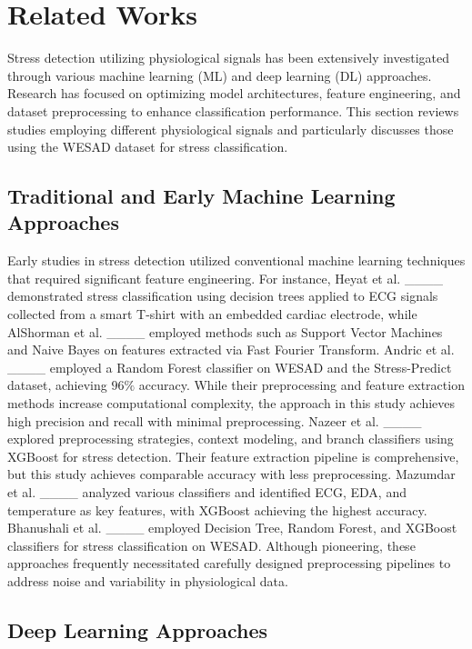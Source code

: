 \section{Related Works}
Stress detection utilizing physiological signals has been extensively investigated through various machine learning (ML) and deep learning (DL) approaches. Research has focused on optimizing model architectures, feature engineering, and dataset preprocessing to enhance classification performance. This section reviews studies employing different physiological signals and particularly discusses those using the WESAD dataset for stress classification.

\subsection{Traditional and Early Machine Learning Approaches}
Early studies in stress detection utilized conventional machine learning techniques that required significant feature engineering. For instance, Heyat et al. ____ demonstrated stress classification using decision trees applied to ECG signals collected from a smart T-shirt with an embedded cardiac electrode, while AlShorman et al. ____ employed methods such as Support Vector Machines and Naive Bayes on features extracted via Fast Fourier Transform. Andric et al. ____ employed a Random Forest classifier on WESAD and the Stress-Predict dataset, achieving $96\%$ accuracy. While their preprocessing and feature extraction methods increase computational complexity, the approach in this study achieves high precision and recall with minimal preprocessing. Nazeer et al. ____ explored preprocessing strategies, context modeling, and branch classifiers using XGBoost for stress detection. Their feature extraction pipeline is comprehensive, but this study achieves comparable accuracy with less preprocessing. Mazumdar et al. ____ analyzed various classifiers and identified ECG, EDA, and temperature as key features, with XGBoost achieving the highest accuracy. Bhanushali et al. ____ employed Decision Tree, Random Forest, and XGBoost classifiers for stress classification on WESAD. Although pioneering, these approaches frequently necessitated carefully designed preprocessing pipelines to address noise and variability in physiological data. 

\subsection{Deep Learning Approaches}

